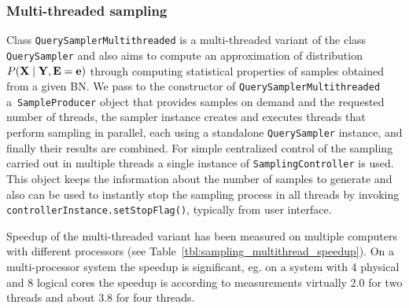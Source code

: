 \documentclass[english,cover]{fitthesis} %
\newcommand{\srccode}[1]{{\tt #1}}         %
\newcommand{\vars}[1]{{\bold{#1}}}         %
\begin{document}
\subsubsection{Multi-threaded sampling}
Class \srccode{QuerySamplerMultithreaded} is a multi-threaded variant of the class \srccode{QuerySampler} and also aims to compute an approximation of distribution $P(\vars{X} \mid \vars{Y}, \vars{E} = \vars{e})$ through computing statistical properties of samples obtained from a given BN. We pass to the constructor of \srccode{QuerySamplerMultithreaded} a~\srccode{SampleProducer} object that provides samples on demand and the requested number of threads, the sampler instance creates and executes threads that perform sampling in parallel, each using a standalone \srccode{QuerySampler} instance, and finally their results are combined. For simple centralized control of the sampling carried out in multiple threads a single instance of \srccode{SamplingController} is used. This object keeps the information about the number of samples to generate and also can be used to instantly stop the sampling process in all threads by invoking \srccode{controllerInstance.setStopFlag()}, typically from user interface.

Speedup of the multi-threaded variant has been measured on multiple computers with different processors (see Table~\ref{tbl:sampling_multithread_speedup}). On a multi-processor system the speedup is significant, eg. on a system with 4 physical and 8 logical cores the speedup is according to measurements virtually 2.0 for two threads and about 3.8 for four threads.
\end{document}
